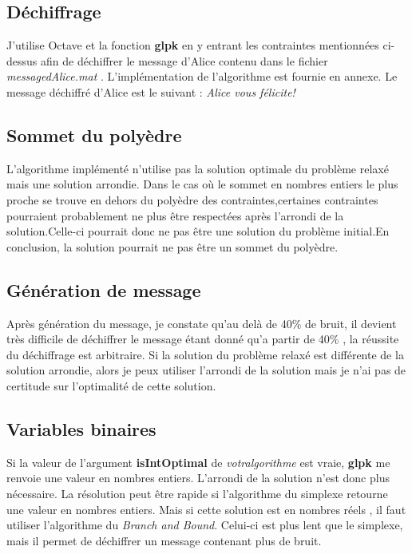 \documentclass[]{article}
\begin{document}
\subsection{Déchiffrage}
J'utilise Octave et la fonction \textbf{glpk} en y entrant les contraintes mentionnées ci-dessus afin de déchiffrer le message d'Alice contenu dans le fichier \textit{messagedAlice.mat} . L'implémentation de l'algorithme est fournie en annexe. Le message déchiffré d'Alice est le suivant : \textit{Alice vous félicite!}
\subsection{Sommet du polyèdre}
L'algorithme implémenté n'utilise pas la solution optimale du problème relaxé mais une solution arrondie.  Dans le cas où le sommet en nombres
entiers le plus proche se trouve en dehors du polyèdre des contraintes,certaines contraintes pourraient probablement ne plus être respectées après l'arrondi de la solution.Celle-ci pourrait donc ne pas être une solution du problème initial.En conclusion, la solution pourrait ne pas être un sommet du polyèdre. 
\subsection{Génération de message}
Après génération du message, je constate qu'au delà de 40\% de bruit, il devient très difficile de déchiffrer le message étant donné qu'a partir de 40\% , la réussite du déchiffrage est arbitraire. Si  la solution du problème relaxé est différente de la solution arrondie, alors
je peux utiliser l’arrondi de la solution mais je n’ai pas de certitude sur l’optimalité de cette solution.
\subsection{Variables binaires}
Si la valeur de l'argument \textbf{isIntOptimal} de \textit{votralgorithme} est vraie, \textbf{glpk} me renvoie une valeur en nombres entiers. L'arrondi de la solution n'est donc plus nécessaire. La résolution peut	être rapide si l'algorithme du simplexe retourne une valeur en nombres entiers. Mais si cette solution est en nombres réels , il faut utiliser l'algorithme du \textit{Branch and Bound}. Celui-ci est plus lent que le simplexe, mais il permet de déchiffrer un message contenant plus de bruit. 
\end{document}
